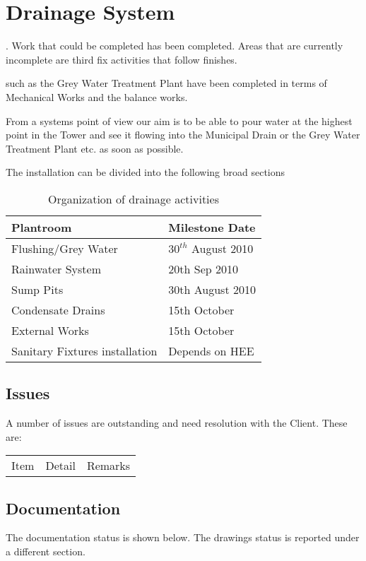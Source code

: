 \chapter{Drainage System}

. Work that could be completed has been completed. Areas that are currently incomplete are third fix activities that follow finishes.


 such as the Grey Water Treatment Plant have been completed in terms of Mechanical Works and the balance works.

From a systems point of view our aim is to be able to pour water at the highest point
in the Tower and see it flowing into the Municipal Drain or the Grey Water Treatment Plant etc.
as soon as possible. 

The installation can be divided into the following broad sections

\begin{table} 
\begin{tabular}{ll}
	      \toprule
	      Plantroom   &  Milestone Date  \\
	      \midrule
	      Flushing/Grey Water       &    $30^{th}$ August 2010  \\
	      Rainwater System      &    20th Sep 2010  \\
	      Sump Pits    &    30th August 2010  \\
	     Condensate Drains &15th October\\
	     External Works &15th October \\
	     Sanitary Fixtures installation &Depends on HEE \\ 
	      \bottomrule
\end{tabular}
             \caption{Organization of drainage activities}
\end{table}

\section{Issues}

A number of issues are outstanding and need resolution with the Client. These are:

\begin{tabular}{lll}
Item  &Detail       &Remarks  \\
\end{tabular}


\section{Documentation}
The documentation status is shown below. The drawings status
is reported under a different section.

